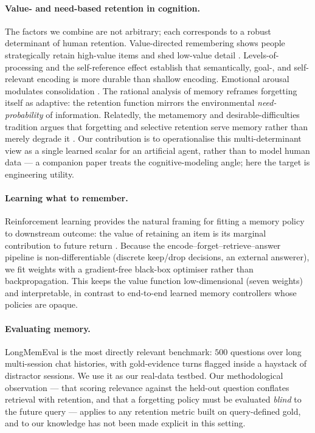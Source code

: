 \paragraph{Value- and need-based retention in cognition.}
The factors we combine are not arbitrary; each corresponds to a robust
determinant of human retention. Value-directed remembering shows people
strategically retain high-value items and shed low-value detail
\citep{castel2008value}. Levels-of-processing
\citep{craik1972lop} and the self-reference effect \citep{rogers1977sre}
establish that semantically, goal-, and self-relevant encoding is more
durable than shallow encoding. Emotional arousal modulates consolidation
\citep{mcgaugh2000consolidation}. The rational analysis of memory
\citep{anderson1991adaptive} reframes forgetting itself as adaptive: the
retention function mirrors the environmental \emph{need-probability} of
information. Relatedly, the metamemory and desirable-difficulties
tradition argues that forgetting and selective retention serve memory
rather than merely degrade it \citep{bjork1994memory}. Our contribution
is to operationalise this
multi-determinant view as a single learned scalar for an artificial
agent, rather than to model human data --- a companion paper treats the
cognitive-modeling angle; here the target is engineering utility.

\paragraph{Learning what to remember.}
Reinforcement learning provides the natural framing for fitting a memory
policy to downstream outcome: the value of retaining an item is its
marginal contribution to future return \citep{sutton2018rl}. Because the
encode--forget--retrieve--answer pipeline is non-differentiable
(discrete keep/drop decisions, an external answerer), we fit weights with
a gradient-free black-box optimiser \citep{hansen2016cmaes} rather than
backpropagation. This keeps the value function low-dimensional (seven
weights) and interpretable, in contrast to end-to-end learned memory
controllers whose policies are opaque.

\paragraph{Evaluating memory.}
LongMemEval \citep{wu2025longmemeval} is the most directly relevant
benchmark: $500$ questions over long multi-session chat histories, with
gold-evidence turns flagged inside a haystack of distractor sessions. We
use it as our real-data testbed. Our methodological observation ---
that scoring relevance against the held-out question conflates retrieval
with retention, and that a forgetting policy must be evaluated
\emph{blind} to the future query --- applies to any retention metric
built on query-defined gold, and to our knowledge has not been made
explicit in this setting.
